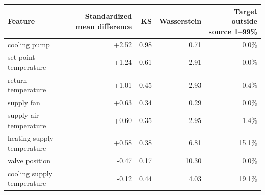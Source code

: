 \begin{tabular}{lrrrr}
\toprule
Feature & Standardized mean difference & KS & Wasserstein & Target outside source 1--99\% \\
\midrule
cooling pump & +2.52 & 0.98 & 0.71 & 0.0\% \\
set point temperature & +1.24 & 0.61 & 2.91 & 0.0\% \\
return temperature & +1.01 & 0.45 & 2.93 & 0.4\% \\
supply fan & +0.63 & 0.34 & 0.29 & 0.0\% \\
supply air temperature & +0.60 & 0.35 & 2.95 & 1.4\% \\
heating supply temperature & +0.58 & 0.38 & 6.81 & 15.1\% \\
valve position & -0.47 & 0.17 & 10.30 & 0.0\% \\
cooling supply temperature & -0.12 & 0.44 & 4.03 & 19.1\% \\
\bottomrule
\end{tabular}